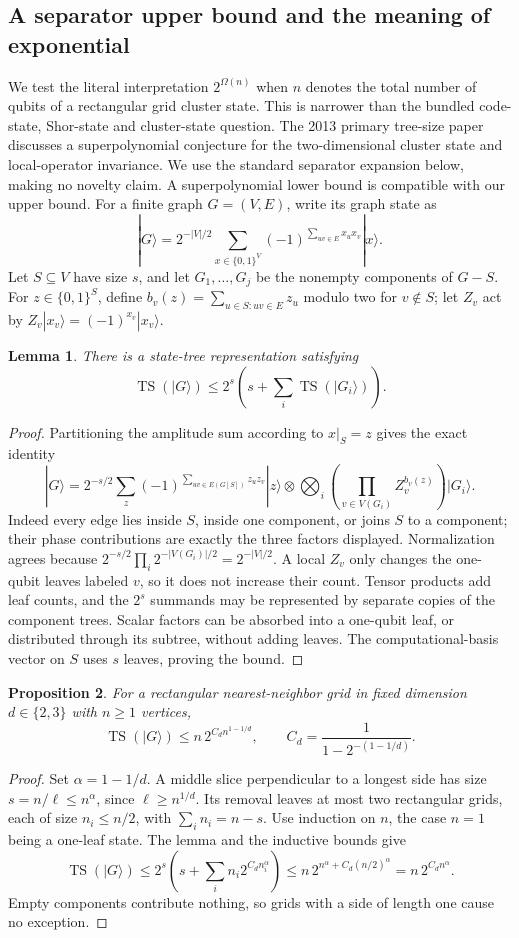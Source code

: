 \documentclass[11pt]{article}
\newtheorem{proposition}{Proposition}
\newtheorem{lemma}[proposition]{Lemma}
\begin{document}
\subsection{A separator upper bound and the meaning of exponential}
We test the literal interpretation $2^{\Omega(n)}$ when $n$ denotes the total number of qubits of a rectangular grid cluster state. This is narrower than the bundled code-state, Shor-state and cluster-state question. The 2013 primary tree-size paper discusses a superpolynomial conjecture for the two-dimensional cluster state and local-operator invariance. We use the standard separator expansion below, making no novelty claim. A superpolynomial lower bound is compatible with our upper bound.
For a finite graph $G=(V,E)$, write its graph state as
\[
|G\rangle=2^{-|V|/2}\sum_{x\in\{0,1\}^V}(-1)^{\sum_{uv\in E}x_ux_v}|x\rangle.
\]
Let $S\subseteq V$ have size $s$, and let $G_1,\ldots,G_j$ be the nonempty components of $G-S$. For $z\in\{0,1\}^S$, define $b_v(z)=\sum_{u\in S:uv\in E}z_u$ modulo two for $v\notin S$; let $Z_v$ act by $Z_v|x_v\rangle=(-1)^{x_v}|x_v\rangle$.
\begin{lemma}
There is a state-tree representation satisfying
\[
\operatorname{TS}(|G\rangle)\le 2^s\left(s+\sum_i\operatorname{TS}(|G_i\rangle)\right).
\]
\end{lemma}
\begin{proof}
Partitioning the amplitude sum according to $x|_S=z$ gives the exact identity
\[
|G\rangle=2^{-s/2}\sum_z(-1)^{\sum_{uv\in E(G[S])}z_uz_v}|z\rangle\otimes
\bigotimes_i\left(\prod_{v\in V(G_i)}Z_v^{b_v(z)}\right)|G_i\rangle.
\]
Indeed every edge lies inside $S$, inside one component, or joins $S$ to a component; their phase contributions are exactly the three factors displayed. Normalization agrees because $2^{-s/2}\prod_i2^{-|V(G_i)|/2}=2^{-|V|/2}$. A local $Z_v$ only changes the one-qubit leaves labeled $v$, so it does not increase their count. Tensor products add leaf counts, and the $2^s$ summands may be represented by separate copies of the component trees. Scalar factors can be absorbed into a one-qubit leaf, or distributed through its subtree, without adding leaves. The computational-basis vector on $S$ uses $s$ leaves, proving the bound.
\end{proof}
\begin{proposition}
For a rectangular nearest-neighbor grid in fixed dimension $d\in\{2,3\}$ with $n\ge1$ vertices,
\[
\operatorname{TS}(|G\rangle)\le n\,2^{C_d n^{1-1/d}},\qquad
C_d=\frac1{1-2^{-(1-1/d)}}.
\]
\end{proposition}
\begin{proof}
Set $\alpha=1-1/d$. A middle slice perpendicular to a longest side has size $s=n/\ell\le n^\alpha$, since $\ell\ge n^{1/d}$. Its removal leaves at most two rectangular grids, each of size $n_i\le n/2$, with $\sum_i n_i=n-s$. Use induction on $n$, the case $n=1$ being a one-leaf state. The lemma and the inductive bounds give
\[
\operatorname{TS}(|G\rangle)
\le2^s\left(s+\sum_i n_i2^{C_d n_i^\alpha}\right)
\le n\,2^{n^\alpha+C_d(n/2)^\alpha}
=n\,2^{C_d n^\alpha}.
\]
Empty components contribute nothing, so grids with a side of length one cause no exception.
\end{proof}
\end{document}
